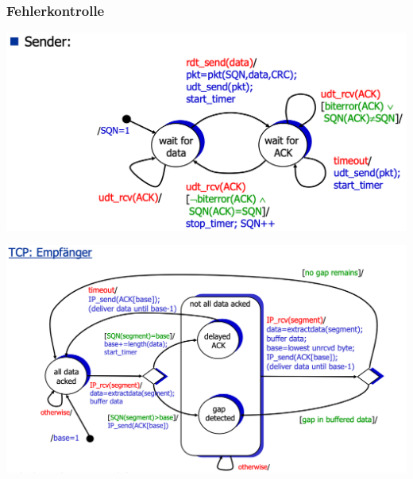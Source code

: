 \subsubsection{Fehlerkontrolle}
\begin{multicols}{2}
\begin{center}
	\includegraphics[scale=0.15]{images/Stop_and_Wait_Sender.png}
\end{center}
\begin{center}
	\includegraphics[scale=0.15]{images/TCP_Fehlerkontrolle_Empfaenger.png}	
\end{center}
\end{multicols}



